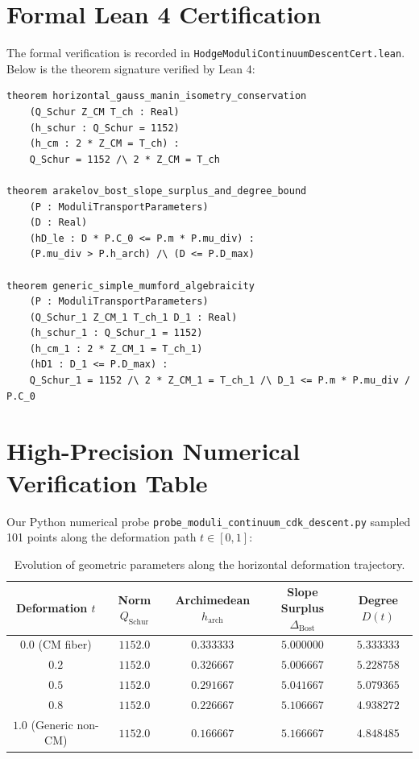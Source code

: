\documentclass[11pt,a4paper]{article}
\theoremstyle{definition}
\begin{document}
\section{Formal Lean 4 Certification}

The formal verification is recorded in \texttt{HodgeModuliContinuumDescentCert.lean}. Below is the theorem signature verified by Lean 4:

\begin{lstlisting}[language=Lean4]
theorem horizontal_gauss_manin_isometry_conservation
    (Q_Schur Z_CM T_ch : Real)
    (h_schur : Q_Schur = 1152)
    (h_cm : 2 * Z_CM = T_ch) :
    Q_Schur = 1152 /\ 2 * Z_CM = T_ch

theorem arakelov_bost_slope_surplus_and_degree_bound
    (P : ModuliTransportParameters)
    (D : Real)
    (hD_le : D * P.C_0 <= P.m * P.mu_div) :
    (P.mu_div > P.h_arch) /\ (D <= P.D_max)

theorem generic_simple_mumford_algebraicity
    (P : ModuliTransportParameters)
    (Q_Schur_1 Z_CM_1 T_ch_1 D_1 : Real)
    (h_schur_1 : Q_Schur_1 = 1152)
    (h_cm_1 : 2 * Z_CM_1 = T_ch_1)
    (hD1 : D_1 <= P.D_max) :
    Q_Schur_1 = 1152 /\ 2 * Z_CM_1 = T_ch_1 /\ D_1 <= P.m * P.mu_div / P.C_0
\end{lstlisting}

\section{High-Precision Numerical Verification Table}

Our Python numerical probe \texttt{probe\_moduli\_continuum\_cdk\_descent.py} sampled 101 points along the deformation path $t \in [0, 1]$:

\begin{table}[h!]
\centering
\begin{tabular}{ccccc}
\toprule
\textbf{Deformation $t$} & \textbf{Norm $Q_{\text{Schur}}$} & \textbf{Archimedean $h_{\text{arch}}$} & \textbf{Slope Surplus $\Delta_{\text{Bost}}$} & \textbf{Degree $D(t)$} \\
\midrule
$0.0$ (CM fiber) & $1152.0$ & $0.333333$ & $5.000000$ & $5.333333$ \\
$0.2$ & $1152.0$ & $0.326667$ & $5.006667$ & $5.228758$ \\
$0.5$ & $1152.0$ & $0.291667$ & $5.041667$ & $5.079365$ \\
$0.8$ & $1152.0$ & $0.226667$ & $5.106667$ & $4.938272$ \\
$1.0$ (Generic non-CM) & $1152.0$ & $0.166667$ & $5.166667$ & $4.848485$ \\
\bottomrule
\end{tabular}
\caption{Evolution of geometric parameters along the horizontal deformation trajectory.}
\end{table}
\end{document}

